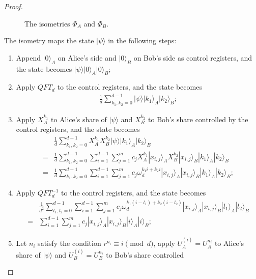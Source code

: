 \documentclass[11pt,letterpaper]{article}
\newcommand{\ket}[1]{|#1\rangle}
\newcommand{\1}{\mathbb{1}}
\newcommand{\EPR}[1]{\Sigma^{(#1)}}
\theoremstyle{definition}
\begin{document}
\begin{proof}
\begin{figure}[H]
	\caption{The isometries $\Phi_A$ and $\Phi_B$.}
\end{figure}
The isometry maps the state $\ket{\psi}$ in the following steps:
\begin{enumerate}
	\item Append $\ket{0}_A$ on Alice's side and $\ket{0}_B$ on Bob's side as control registers, and
	the state becomes $\ket{\psi} \ket{0}_A \ket{0}_B$;
	\item Apply $QFT_d$ to the control registers, and the state becomes
	\begin{align}
		\frac{1}{d} \sum_{k_1,k_2 =0}^{d-1} \ket{\psi} \ket{k_1}_A \ket{k_2}_B;
	\end{align}
	\item Apply $X_A^{k_1}$ to Alice's share of $\ket{\psi}$ and $X_B^{k_2}$ to Bob's share controlled
	by the control registers, and the state becomes
	\begin{align}
		&\frac{1}{d} \sum_{k_1,k_2 =0}^{d-1}X_A^{k_1} X_B^{k_2}\ket{\psi} \ket{k_1}_A \ket{k_2}_B\\
		=&\frac{1}{d} \sum_{k_1,k_2 =0}^{d-1} \sum_{i=1}^{d-1}\sum_{j=1}^m c_j X_A^{k_1}\ket{x_{i,j}}_A X_B^{k_2}\ket{x_{i,j}}_B
		\ket{k_1}_A \ket{k_2}_B\\
		=&\frac{1}{d} \sum_{k_1,k_2 =0}^{d-1} \sum_{i=1}^{d-1}\sum_{j=1}^m c_j \omega_d^{k_1i+k_2i} \ket{x_{i,j}}_A\ket{x_{i,j}}_B
		\ket{k_1}_A \ket{k_2}_B;
	\end{align}
	\item Apply $QFT_d^{-1}$ to the control registers, and the state becomes
	\begin{align}
		&\frac{1}{d^2} \sum_{l_1,l_2 =0}^{d-1}\sum_{i=1}^{d-1}\sum_{j=1}^m c_j \omega_d^{k_1(i-l_1)+k_2(i-l_2)} \ket{x_{i,j}}_A\ket{x_{i,j}}_B
		\ket{l_1}_A \ket{l_2}_B\\
		=& \sum_{i=1}^{d-1}\sum_{j=1}^m c_j \ket{x_{i,j}}_A\ket{x_{i,j}}_B \ket{i}_A \ket{i}_B;
	\end{align}
	\item Let $n_i$ satisfy the condition $r^{n_i} \equiv i \pmod{d}$, apply $U_A^{(i)} = U_A^{n_i}$ to Alice's share of $\ket{\psi}$ and $U_B^{(i)} = U_B^{n_i}$ to Bob's share controlled

\end{enumerate}
\end{proof}
\end{document}
